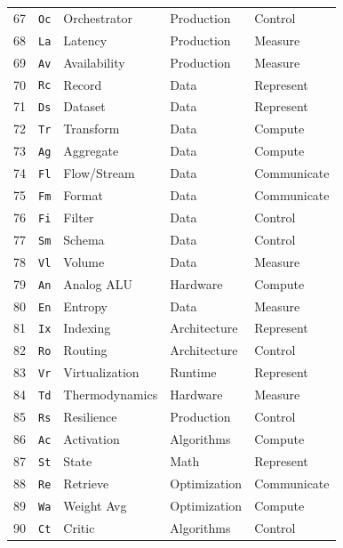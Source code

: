 \begin{table}[!t]
\begin{minipage}[t]{0.49\textwidth}
\begin{tabular}{@{}r l l l l@{}}
67 & \texttt{Oc} & Orchestrator & Production & Control \\
68 & \texttt{La} & Latency & Production & Measure \\
69 & \texttt{Av} & Availability & Production & Measure \\
70 & \texttt{Rc} & Record & Data & Represent \\
71 & \texttt{Ds} & Dataset & Data & Represent \\
72 & \texttt{Tr} & Transform & Data & Compute \\
73 & \texttt{Ag} & Aggregate & Data & Compute \\
74 & \texttt{Fl} & Flow/Stream & Data & Communicate \\
75 & \texttt{Fm} & Format & Data & Communicate \\
76 & \texttt{Fi} & Filter & Data & Control \\
77 & \texttt{Sm} & Schema & Data & Control \\
78 & \texttt{Vl} & Volume & Data & Measure \\
79 & \texttt{An} & Analog ALU & Hardware & Compute \\
80 & \texttt{En} & Entropy & Data & Measure \\
81 & \texttt{Ix} & Indexing & Architecture & Represent \\
82 & \texttt{Ro} & Routing & Architecture & Control \\
83 & \texttt{Vr} & Virtualization & Runtime & Represent \\
84 & \texttt{Td} & Thermodynamics & Hardware & Measure \\
85 & \texttt{Rs} & Resilience & Production & Control \\
86 & \texttt{Ac} & Activation & Algorithms & Compute \\
87 & \texttt{St} & State & Math & Represent \\
88 & \texttt{Re} & Retrieve & Optimization & Communicate \\
89 & \texttt{Wa} & Weight Avg & Optimization & Compute \\
90 & \texttt{Ct} & Critic & Algorithms & Control \\
\bottomrule
\end{tabular}
\end{minipage}
\end{table}
